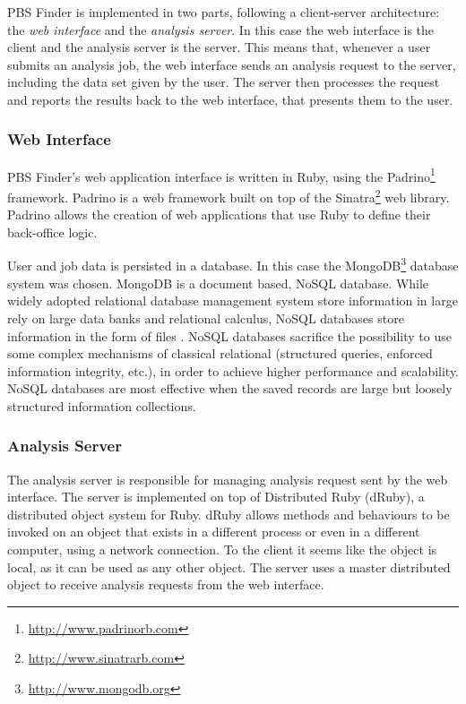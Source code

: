 PBS Finder is implemented in two parts, following a client-server architecture:
the \emph{web interface} and the \emph{analysis server}. In this case the web
interface is the client and the analysis server is the server. This means that,
whenever a user submits an analysis job, the web interface sends an analysis
request to the server, including the data set given by the user. The server then
processes the request and reports the results back to the web interface, that
presents them to the user.

\subsubsection*{Web Interface}

PBS Finder's web application interface is written in Ruby, using the
Padrino\footnote{\url{http://www.padrinorb.com}} framework. Padrino is a web
framework built on top of the Sinatra\footnote{\url{http://www.sinatrarb.com}}
web library. Padrino allows the creation of web applications that use Ruby to
define their back-office logic.

User and job data is persisted in a database. In this case the
MongoDB\footnote{\url{http://www.mongodb.org}} database system was chosen.
MongoDB is a document based, NoSQL database. While widely adopted relational
database management system store information in large rely on large data banks
and relational calculus, NoSQL databases store information in the form of files
\cite{strauch2011nosql}. NoSQL databases sacrifice the possibility to use some
complex mechanisms of classical relational (structured queries, enforced
information integrity, etc.), in order to achieve higher performance and
scalability. NoSQL databases are most effective when the saved records are large
but loosely structured information collections.

\subsubsection*{Analysis Server}

The analysis server is responsible for managing analysis request sent by the web
interface. The server is implemented on top of Distributed Ruby (dRuby), a
distributed object system for Ruby. dRuby allows methods and behaviours to be
invoked on an object that exists in a different process or even in a different
computer, using a network connection. To the client it seems like the object is
local, as it can be used as any other object. The server uses a master
distributed object to receive analysis requests from the web interface.

